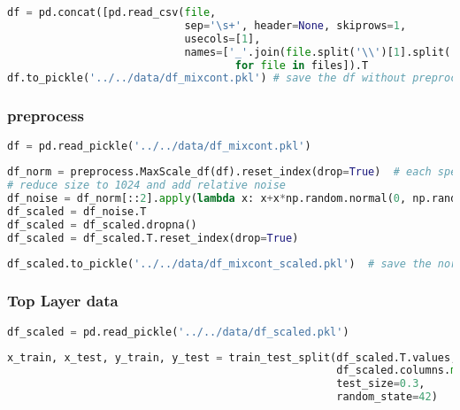 \begin{lstlisting}[language=Python]
df = pd.concat([pd.read_csv(file,
                            sep='\s+', header=None, skiprows=1,
                            usecols=[1],
                            names=['_'.join(file.split('\\')[1].split('_')[:-1])]).T 
                                    for file in files]).T
df.to_pickle('../../data/df_mixcont.pkl') # save the df without preprocessing
\end{lstlisting}

\hypertarget{preprocess}{%
\subsubsection*{preprocess}\label{preprocess}}

\begin{lstlisting}[language=Python]
df = pd.read_pickle('../../data/df_mixcont.pkl') 
\end{lstlisting}

\begin{lstlisting}[language=Python]
df_norm = preprocess.MaxScale_df(df).reset_index(drop=True)  # each spectrum is scaled to 1
# reduce size to 1024 and add relative noise
df_noise = df_norm[::2].apply(lambda x: x+x*np.random.normal(0, np.random.randint(1,3)*0.01 , len(x)))
df_scaled = df_noise.T
df_scaled = df_scaled.dropna()
df_scaled = df_scaled.T.reset_index(drop=True)
\end{lstlisting}

\begin{lstlisting}[language=Python]
df_scaled.to_pickle('../../data/df_mixcont_scaled.pkl')  # save the normalized, scaled df
\end{lstlisting}

\hypertarget{top-layer-data}{%
\subsubsection*{Top Layer data}\label{top-layer-data}}

\begin{lstlisting}[language=Python]
df_scaled = pd.read_pickle('../../data/df_scaled.pkl')
\end{lstlisting}

\begin{lstlisting}[language=Python]
x_train, x_test, y_train, y_test = train_test_split(df_scaled.T.values,
                                                    df_scaled.columns.map(lambda x: x.split('_')[0]), # first part of the filename is the top label
                                                    test_size=0.3,
                                                    random_state=42)
\end{lstlisting}

